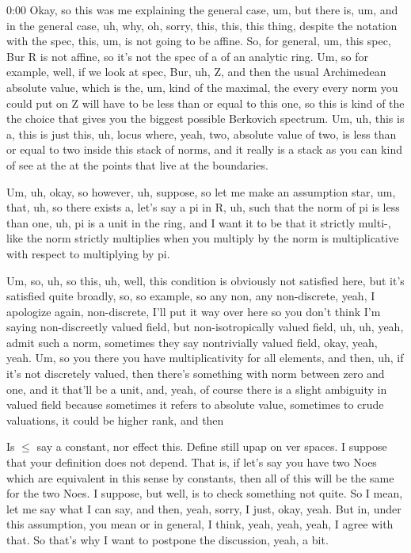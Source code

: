 \begin{unfinished}{0:00}
Okay, so this was me explaining the general case, um, but there is, um, and in the general case, uh, why, oh, sorry, this, this, this thing, despite the notation with the spec, this, um, is not going to be affine. So, for general, um, this spec, Bur R is not affine, so it's not the spec of a of an analytic ring. Um, so for example, well, if we look at spec, Bur, uh, Z, and then the usual Archimedean absolute value, which is the, um, kind of the maximal, the every every norm you could put on Z will have to be less than or equal to this one, so this is kind of the the choice that gives you the biggest possible Berkovich spectrum. Um, uh, this is a, this is just this, uh, locus where, yeah, two, absolute value of two, is less than or equal to two inside this stack of norms, and it really is a stack as you can kind of see at the at the points that live at the boundaries.

Um, uh, okay, so however, uh, suppose, so let me make an assumption star, um, that, uh, so there exists a, let's say a pi in R, uh, such that the norm of pi is less than one, uh, pi is a unit in the ring, and I want it to be that it strictly multi-, like the norm strictly multiplies when you multiply by the norm is multiplicative with respect to multiplying by pi.

Um, so, uh, so this, uh, well, this condition is obviously not satisfied here, but it's satisfied quite broadly, so, so example, so any non, any non-discrete, yeah, I apologize again, non-discrete, I'll put it way over here so you don't think I'm saying non-discreetly valued field, but non-isotropically valued field, uh, uh, yeah, admit such a norm, sometimes they say nontrivially valued field, okay, yeah, yeah. Um, so you there you have multiplicativity for all elements, and then, uh, if it's not discretely valued, then there's something with norm between zero and one, and it that'll be a unit, and, yeah, of course there is a slight ambiguity in valued field because sometimes it refers to absolute value, sometimes to crude valuations, it could be higher rank, and then

Is $\leq$ say a constant, nor effect this. Define still upap on ver spaces. I suppose that your definition does not depend. That is, if let's say you have two Noes which are equivalent in this sense by constants, then all of this will be the same for the two Noes. I suppose, but well, is to check something not quite. So I mean, let me say what I can say, and then, yeah, sorry, I just, okay, yeah. But in, under this assumption, you mean or in general, I think, yeah, yeah, yeah, I agree with that. So that's why I want to postpone the discussion, yeah, a bit. 


\end{unfinished}
